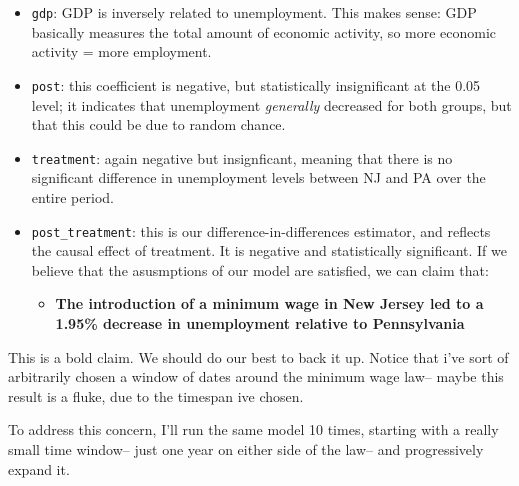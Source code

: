\documentclass[
  letterpaper,
  DIV=11,
  numbers=noendperiod]{scrreprt}
\providecommand{\tightlist}{%
  \setlength{\itemsep}{0pt}\setlength{\parskip}{0pt}}\usepackage{longtable,booktabs,array}
\begin{document}
\begin{itemize}
\tightlist
\item
  \texttt{gdp}: GDP is inversely related to unemployment. This makes
  sense: GDP basically measures the total amount of economic activity,
  so more economic activity = more employment.
\item
  \texttt{post}: this coefficient is negative, but statistically
  insignificant at the 0.05 level; it indicates that unemployment
  \emph{generally} decreased for both groups, but that this could be due
  to random chance.
\item
  \texttt{treatment}: again negative but insignficant, meaning that
  there is no significant difference in unemployment levels between NJ
  and PA over the entire period.
\item
  \texttt{post\_treatment}: this is our difference-in-differences
  estimator, and reflects the causal effect of treatment. It is negative
  and statistically significant. If we believe that the asusmptions of
  our model are satisfied, we can claim that:

  \begin{itemize}
  \tightlist
  \item
    \textbf{The introduction of a minimum wage in New Jersey led to a
    1.95\% decrease in unemployment relative to Pennsylvania}
  \end{itemize}
\end{itemize}

This is a bold claim. We should do our best to back it up. Notice that
i've sort of arbitrarily chosen a window of dates around the minimum
wage law-- maybe this result is a fluke, due to the timespan ive chosen.

To address this concern, I'll run the same model 10 times, starting with
a really small time window-- just one year on either side of the law--
and progressively expand it.
\end{document}
